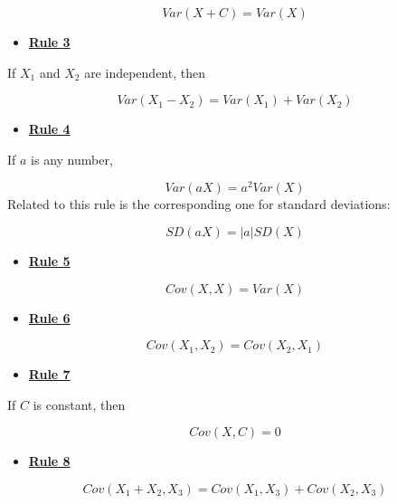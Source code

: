 \documentclass[
]{book}
\providecommand{\tightlist}{%
  \setlength{\itemsep}{0pt}\setlength{\parskip}{0pt}}
\begin{document}
\[
Var\left(X + C\right) = Var\left(X\right)
\]

\begin{itemize}
\tightlist
\item
  \href{./variance.html\#Rule3}{\textbf{Rule 3}}
\end{itemize}

If \(X_{1}\) and \(X_{2}\) are independent, then

\[
Var\left(X_{1} - X_{2}\right) =
Var\left(X_{1}\right) + Var\left(X_{2}\right)
\]

\begin{itemize}
\tightlist
\item
  \href{./variance.html\#Rule4}{\textbf{Rule 4}}
\end{itemize}

If \(a\) is any number,

\[
Var\left(aX\right) = a^2 Var\left(X\right)
\]
Related to this rule is the corresponding one for standard deviations:

\[
SD\left(aX\right) = \left| a \right| SD\left(X\right)
\]

\begin{itemize}
\tightlist
\item
  \href{./covariance.html\#Rule5}{\textbf{Rule 5}}
\end{itemize}

\[
Cov(X, X) = Var(X)
\]

\begin{itemize}
\tightlist
\item
  \href{./covariance.html\#Rule6}{\textbf{Rule 6}}
\end{itemize}

\[
Cov\left(X_{1}, X_{2}\right) = Cov\left(X_{2}, X_{1}\right)
\]

\begin{itemize}
\tightlist
\item
  \href{./covariance.html\#Rule7}{\textbf{Rule 7}}
\end{itemize}

If \(C\) is constant, then

\[
Cov\left(X, C\right) = 0
\]

\begin{itemize}
\tightlist
\item
  \href{./covariance.html\#Rule8}{\textbf{Rule 8}}
\end{itemize}

\[
Cov\left(X_{1} + X_{2}, X_{3}\right) = Cov\left(X_{1}, X_{3}\right) + Cov\left(X_{2}, X_{3}\right)  
\]
\end{document}
